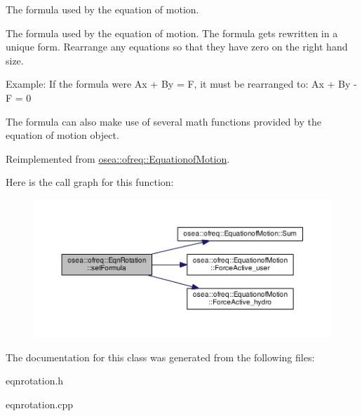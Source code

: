 The formula used by the equation of motion. 

The formula used by the equation of motion. The formula gets rewritten in a unique form. Rearrange any equations so that they have zero on the right hand size.

Example\-: If the formula were Ax + By = F, it must be rearranged to\-: Ax + By -\/ F = 0

The formula can also make use of several math functions provided by the equation of motion object. 

Reimplemented from \hyperlink{classosea_1_1ofreq_1_1_equationof_motion_a1d8614b11de9396f3795e4b560e6c368}{osea\-::ofreq\-::\-Equationof\-Motion}.



Here is the call graph for this function\-:
\nopagebreak
\begin{figure}[H]
\begin{center}
\leavevmode
\includegraphics[width=350pt]{classosea_1_1ofreq_1_1_eqn_rotation_a910975e9e2e8d438853a4e7d658850a8_cgraph}
\end{center}
\end{figure}




The documentation for this class was generated from the following files\-:\begin{DoxyCompactItemize}
\item 
eqnrotation.\-h\item 
eqnrotation.\-cpp\end{DoxyCompactItemize}
